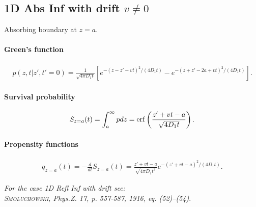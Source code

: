 
\subsection{1D Abs Inf with drift $v\neq 0$}

Absorbing boundary at $z=a$.

\paragraph{Green's function}
\begin{align}
  p(z,t|z',t'=0) = \frac{1}{\sqrt{4 \pi D_1t}}
  \left[ e^{-(z-z'-vt)^2/(4 D_1 t)} - e^{-(z+z'-2a+vt)^2/(4 D_1 t)} \right].
\end{align}

\paragraph{Survival probability}
\begin{align}
  S_{z=a}(t) = \int_a^\infty p dz =
  \operatorname{erf} \left(\frac{z'+vt-a}{\sqrt{4 D_1 t}} \right).
\end{align}

\paragraph{Propensity functions}
\begin{align}
  q_{z=a}(t) = -\frac{d}{dt} S_{z=a}(t)=
  \frac{z'+vt-a}{\sqrt{4 \pi D_1 t^3}} e^{-(z'+vt-a)^2/(4D_1t)}.
\end{align}

\vspace{1cm}
\noindent \textit{For the case 1D Refl Inf with drift see:}\\
\textit{\textsc{Smoluchowski}, Phys.Z. 17, p. 557-587, 1916, eq. (52)--(54)}.